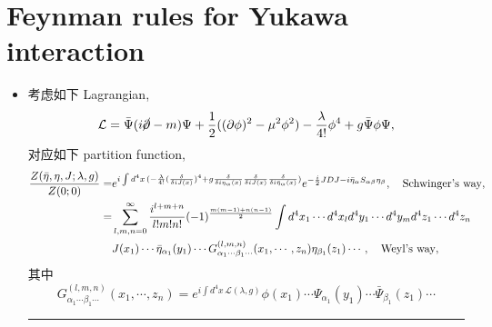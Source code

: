 \section{Feynman rules for Yukawa interaction}
\begin{itemize}
	\item 考虑如下 Lagrangian,
	\begin{equation}
		\mathcal{L} = \bar{\Psi} (i \cancel{\partial} - m) \Psi + \frac{1}{2} ((\partial \phi)^2 - \mu^2 \phi^2) - \frac{\lambda}{4!} \phi^4 + g \bar{\Psi} \phi \Psi,
	\end{equation}
	对应如下 partition function,
	\begin{align}
		\frac{Z(\bar{\eta}, \eta, J; \lambda, g)}{Z(0; 0)} =& e^{i \int d^4 x \, (- \frac{\lambda}{4!} (\frac{\delta}{\delta i J(x)})^4 + g \frac{\delta}{\delta i \eta_\alpha(x)} \frac{\delta}{\delta i J(x)} \frac{\delta}{\delta i \bar{\eta}_\alpha(x)})} e^{- \frac{i}{2} J D J - i \bar{\eta}_\alpha S_{\alpha \beta} \eta_\beta}, \quad \text{Schwinger's way}, \notag \\
		=& \sum_{l, m, n = 0}^\infty \frac{i^{l + m + n}}{l! m! n!} (- 1)^{\frac{m (m - 1) + n (n - 1)}{2}} \int d^4 x_1 \cdots d^4 x_l d^4 y_1 \cdots d^4 y_m d^4 z_1 \cdots d^4 z_n \notag \\
		& J(x_1) \cdots \bar{\eta}_{\alpha_1}(y_1) \cdots G^{(l, m, n)}_{\alpha_1 \cdots \beta_1 \cdots}(x_1, \cdots, z_n) \eta_{\beta_1}(z_1) \cdots, \quad \text{Weyl's way},
	\end{align}
	其中
	\begin{equation}
		G^{(l, m, n)}_{\alpha_1 \cdots \beta_1 \cdots}(x_1, \cdots, z_n) = e^{i \int d^4 x \, \mathcal{L}(\lambda, g)} \phi(x_1) \cdots \Psi_{\alpha_1}(y_1) \cdots \bar{\Psi}_{\beta_1}(z_1) \cdots
	\end{equation}
	
	\noindent\rule[0.5ex]{\linewidth}{0.5pt} %
	

\end{itemize}
